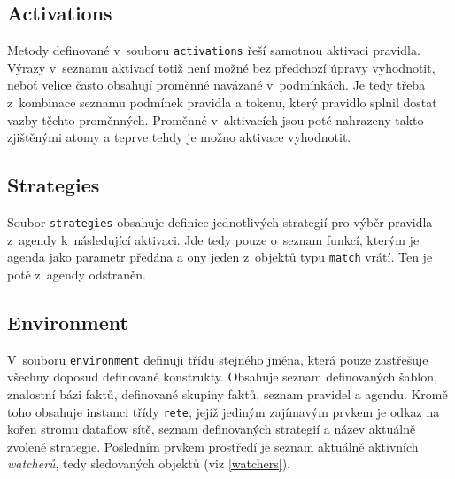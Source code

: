 \subsection{Activations}
Metody definované v~souboru \verb|activations| řeší samotnou aktivaci pravidla.
Výrazy v~seznamu aktivací totiž není možné bez předchozí úpravy vyhodnotit,
neboť velice často obsahují proměnné navázané v~podmínkách. Je tedy třeba
z~kombinace seznamu podmínek pravidla a tokenu, který pravidlo splnil dostat
vazby těchto proměnných. Proměnné v~aktivacích jsou poté nahrazeny takto
zjištěnými atomy a teprve tehdy je možno aktivace vyhodnotit.
\subsection{Strategies}
Soubor \verb|strategies| obsahuje definice jednotlivých strategií pro výběr
pravidla z~agendy k~následující aktivaci. Jde tedy pouze o~seznam funkcí,
kterým je agenda jako parametr předána a ony jeden z~objektů typu \verb|match|
vrátí. Ten je poté z~agendy odstraněn.
\subsection{Environment}
V~souboru \verb|environment| definuji třídu stejného jména, která pouze
zastřešuje všechny doposud definované konstrukty. Obsahuje seznam definovaných
šablon, znalostní bázi faktů, definované skupiny faktů, seznam pravidel
a agendu. Kromě toho obsahuje instanci třídy \verb|rete|, jejíž jediným
zajímavým prvkem je odkaz na kořen stromu dataflow sítě, seznam definovaných
strategií a název aktuálně zvolené strategie. Posledním prvkem prostředí
je seznam aktuálně aktivních \emph{watcherů}, tedy sledovaných objektů
(viz \ref{watchers}).
